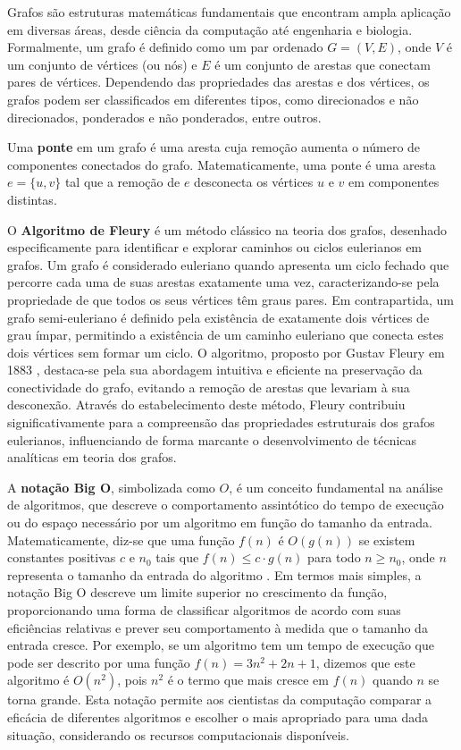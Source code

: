 \documentclass[12pt]{article}
\begin{document}
Grafos são estruturas matemáticas fundamentais que encontram ampla aplicação em diversas áreas, desde ciência da computação até engenharia e biologia. Formalmente, um grafo é definido como um par ordenado \(G = (V, E)\), onde \(V\) é um conjunto de vértices (ou nós) e \(E\) é um conjunto de arestas que conectam pares de vértices. Dependendo das propriedades das arestas e dos vértices, os grafos podem ser classificados em diferentes tipos, como direcionados e não direcionados, ponderados e não ponderados, entre outros.

Uma \textbf{ponte} em um grafo é uma aresta cuja remoção aumenta o número de componentes conectados do grafo. Matematicamente, uma ponte é uma aresta \(e = \{u, v\}\) tal que a remoção de \(e\) desconecta os vértices \(u\) e \(v\) em componentes distintas.

O \textbf{Algoritmo de Fleury} é um método clássico na teoria dos grafos, desenhado especificamente para identificar e explorar caminhos ou ciclos eulerianos em grafos. Um grafo é considerado euleriano quando apresenta um ciclo fechado que percorre cada uma de suas arestas exatamente uma vez, caracterizando-se pela propriedade de que todos os seus vértices têm graus pares. Em contrapartida, um grafo semi-euleriano é definido pela existência de exatamente dois vértices de grau ímpar, permitindo a existência de um caminho euleriano que conecta estes dois vértices sem formar um ciclo. O algoritmo, proposto por Gustav Fleury em 1883 \cite{fleury1883deux}, destaca-se pela sua abordagem intuitiva e eficiente na preservação da conectividade do grafo, evitando a remoção de arestas que levariam à sua desconexão. Através do estabelecimento deste método, Fleury contribuiu significativamente para a compreensão das propriedades estruturais dos grafos eulerianos, influenciando de forma marcante o desenvolvimento de técnicas analíticas em teoria dos grafos.

A \textbf{notação Big O}, simbolizada como \(O\), é um conceito fundamental na análise de algoritmos, que descreve o comportamento assintótico do tempo de execução ou do espaço necessário por um algoritmo em função do tamanho da entrada. Matematicamente, diz-se que uma função \(f(n)\) é \(O(g(n))\) se existem constantes positivas \(c\) e \(n_0\) tais que \(f(n) \leq c \cdot g(n)\) para todo \(n \geq n_0\), onde \(n\) representa o tamanho da entrada do algoritmo \cite{KleinbergTardos2005}. Em termos mais simples, a notação Big O descreve um limite superior no crescimento da função, proporcionando uma forma de classificar algoritmos de acordo com suas eficiências relativas e prever seu comportamento à medida que o tamanho da entrada cresce. Por exemplo, se um algoritmo tem um tempo de execução que pode ser descrito por uma função \(f(n) = 3n^2 + 2n + 1\), dizemos que este algoritmo é \(O(n^2)\), pois \(n^2\) é o termo que mais cresce em \(f(n)\) quando \(n\) se torna grande. Esta notação permite aos cientistas da computação comparar a eficácia de diferentes algoritmos e escolher o mais apropriado para uma dada situação, considerando os recursos computacionais disponíveis.
\end{document}
